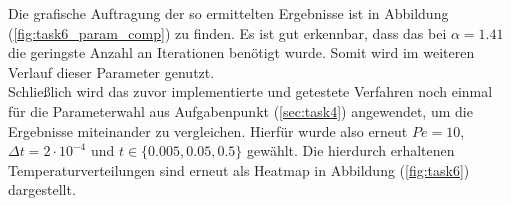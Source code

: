 \documentclass[12pt,a4paper,titlepage,headinclude,bibtotoc]{scrartcl}
\begin{document}
\noindent\begin{minipage}[t]{0.45\textwidth}%
\vspace{1cm}
Die grafische Auftragung der so ermittelten Ergebnisse ist in Abbildung (\ref{fig:task6_param_comp}) zu finden. Es ist gut erkennbar, dass das bei $\alpha=1.41$ die geringste Anzahl an Iterationen benötigt wurde. Somit wird im weiteren Verlauf dieser Parameter genutzt.\\
Schließlich wird das zuvor implementierte und getestete Verfahren noch einmal für die Parameterwahl aus Aufgabenpunkt (\ref{sec:task4}) angewendet, um die Ergebnisse miteinander zu vergleichen. Hierfür wurde also erneut $Pe = 10$, $\Delta t = 2 \cdot 10^{-4}$ und $t \in \{0.005, 0.05, 0.5\}$ gewählt. Die hierdurch erhaltenen Temperaturverteilungen sind erneut als Heatmap in Abbildung (\ref{fig:task6}) dargestellt.
\end{minipage}%
\hfill%
\end{document}
